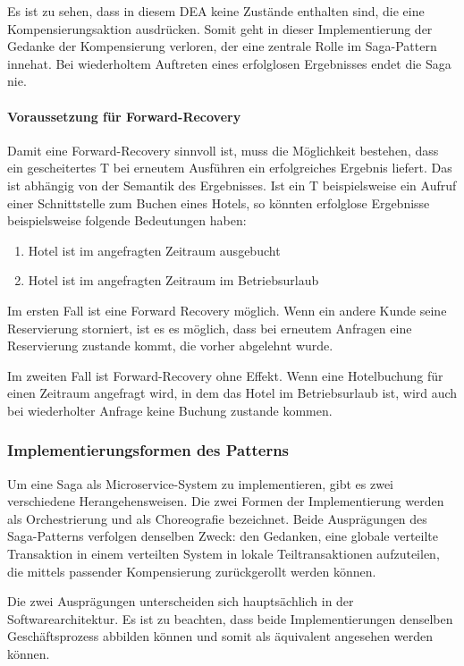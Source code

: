 Es ist zu sehen, dass in diesem DEA keine Zustände enthalten sind, die eine Kompensierungsaktion ausdrücken. Somit geht in dieser Implementierung der Gedanke der Kompensierung verloren, der eine zentrale Rolle im Saga-Pattern innehat. Bei wiederholtem Auftreten eines erfolglosen Ergebnisses endet die Saga nie. 

\paragraph{Voraussetzung für Forward-Recovery}
Damit eine Forward-Recovery sinnvoll ist, muss die Möglichkeit bestehen, dass ein gescheitertes T bei erneutem Ausführen ein erfolgreiches Ergebnis liefert. Das ist abhängig von der Semantik des Ergebnisses. Ist ein T beispielsweise ein Aufruf einer Schnittstelle zum Buchen eines Hotels, so könnten erfolglose Ergebnisse beispielsweise folgende Bedeutungen haben:
\begin{enumerate}
	\item Hotel ist im angefragten Zeitraum ausgebucht
	\item Hotel ist im angefragten Zeitraum im Betriebsurlaub 
\end{enumerate}

Im ersten Fall ist eine Forward Recovery möglich. Wenn ein andere Kunde seine Reservierung storniert, ist es es möglich, dass bei erneutem Anfragen eine Reservierung zustande kommt, die vorher abgelehnt wurde.

Im zweiten Fall ist Forward-Recovery ohne Effekt. Wenn eine Hotelbuchung für einen Zeitraum angefragt wird, in dem das Hotel im Betriebsurlaub ist, wird auch bei wiederholter Anfrage keine Buchung zustande kommen.

\subsubsection{Implementierungsformen des Patterns}\label{subs_Saga_Implementierungsformen}
Um eine Saga als Microservice-System zu implementieren, gibt es zwei verschiedene Herangehensweisen. Die zwei Formen der Implementierung werden als Orchestrierung und als Choreografie bezeichnet. Beide Ausprägungen des Saga-Patterns verfolgen denselben Zweck: den Gedanken, eine globale verteilte Transaktion in einem verteilten System in lokale Teiltransaktionen aufzuteilen, die mittels passender Kompensierung zurückgerollt werden können. 

Die zwei Ausprägungen unterscheiden sich hauptsächlich in der Softwarearchitektur. Es ist zu beachten, dass beide Implementierungen denselben Geschäftsprozess abbilden können und somit als äquivalent angesehen werden können. %

